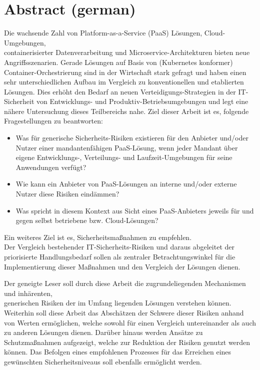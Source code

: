 \chapter*{Abstract (german)}
\thispagestyle{empty}
Die wachsende Zahl von Platform-as-a-Service (PaaS) Lösungen, Cloud-Umgebungen, \\
containerisierter Datenverarbeitung und Microservice-Architekturen bieten neue Angriffsszenarien.
Gerade Lösungen auf Basis von (Kubernetes konformer) Container-Orchestrierung sind in der Wirtschaft stark gefragt und haben einen sehr unterschiedlichen Aufbau im Vergleich zu konventionellen und etablierten Lösungen.
Dies erhöht den Bedarf an neuen Verteidigungs-Strategien in der IT-Sicherheit von Entwicklungs- und Produktiv-Betriebsumgebungen und legt eine nähere Untersuchung dieses Teilbereichs nahe.
Ziel dieser Arbeit ist es, folgende Fragestellungen zu beantworten:

\begin{itemize}

\item Was für generische Sicherheits-Risiken existieren für den Anbieter und/oder Nutzer einer mandantenfähigen PaaS-Lösung, wenn jeder Mandant über eigene Entwicklungs-, Verteilungs- und Laufzeit-Umgebungen für seine Anwendungen verfügt?

\item Wie kann ein Anbieter von PaaS-Lösungen an interne und/oder externe Nutzer diese Risiken eindämmen?

\item Was spricht in diesem Kontext aus Sicht eines PaaS-Anbieters jeweils für und gegen selbst betriebene bzw. Cloud-Lösungen?

\end{itemize}

Ein weiteres Ziel ist es, Sicherheitsmaßnahmen zu empfehlen. \\
Der Vergleich bestehender IT-Sicherheits-Risiken und daraus abgeleitet der priorisierte Handlungsbedarf sollen als zentraler Betrachtungswinkel für die Implementierung dieser Maßnahmen und den Vergleich der Lösungen dienen. 

Der geneigte Leser soll durch diese Arbeit die zugrundeliegenden Mechanismen und inhärenten, \\
generischen Risiken der im Umfang liegenden Lösungen verstehen können.
Weiterhin soll diese Arbeit das Abschätzen der Schwere dieser Risiken anhand von Werten ermöglichen, welche sowohl für einen Vergleich untereinander als auch zu anderen Lösungen dienen. Darüber hinaus werden Ansätze zu Schutzmaßnahmen aufgezeigt, welche zur Reduktion der Risiken genutzt werden können. Das Befolgen eines empfohlenen Prozesses für das Erreichen eines gewünschten Sicherheitsniveaus soll ebenfalls ermöglicht werden.


